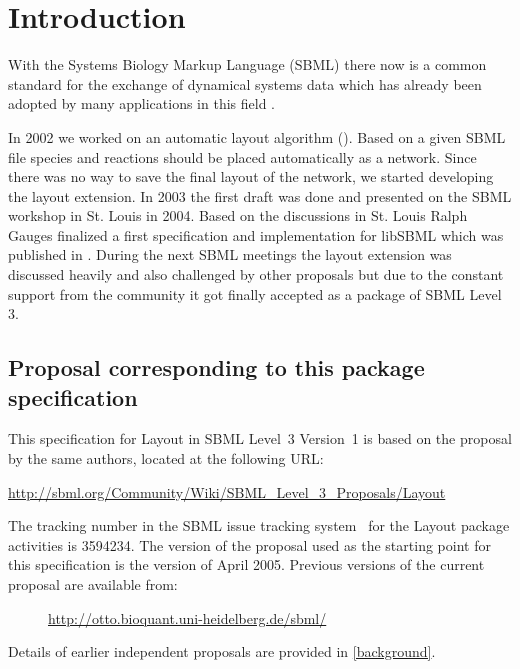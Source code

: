 \section{Introduction}

With the Systems Biology Markup Language (SBML) there now is a common standard for the exchange of dynamical systems data which has already 
been adopted by many applications in this field \cite{SBMLWebsite,sbml3core,SBMLArticle}. 

In 2002 we worked on an automatic layout algorithm (\cite{KatjaLayout}). Based on a given SBML file species and reactions should be placed automatically as a network. Since there was no way to save the final layout of the network, we started developing the layout extension. In 2003 the first draft was done and presented on the SBML workshop in St. Louis in 2004. Based on the discussions in St. Louis Ralph Gauges finalized a first specification and implementation for libSBML which was published in \cite{Gauges01082006}. During the next SBML meetings the layout extension was discussed heavily and also challenged by other proposals but due to the constant support from the community \cite{Deckard01122006}  it got finally accepted as a package of SBML Level 3. 

\subsection{Proposal corresponding to this package specification}

This specification for Layout in SBML Level~3
Version~1 is based on the proposal by the same authors, located at the
following URL:

\begin{center}
  \vspace*{1ex}\small
  \url{http://sbml.org/Community/Wiki/SBML_Level_3_Proposals/Layout}
  \vspace*{1ex}
\end{center}

The tracking number in the SBML issue tracking system~\citep{tracker}
for the Layout package activities is 3594234.  The
version of the proposal used as the starting point for this
specification is the version of April 2005. Previous versions of the current proposal are available from:
\begin{description}
  \item [] \small{\url{http://otto.bioquant.uni-heidelberg.de/sbml/}}  
\end{description}
Details of earlier independent proposals are provided in \ref{background}.

